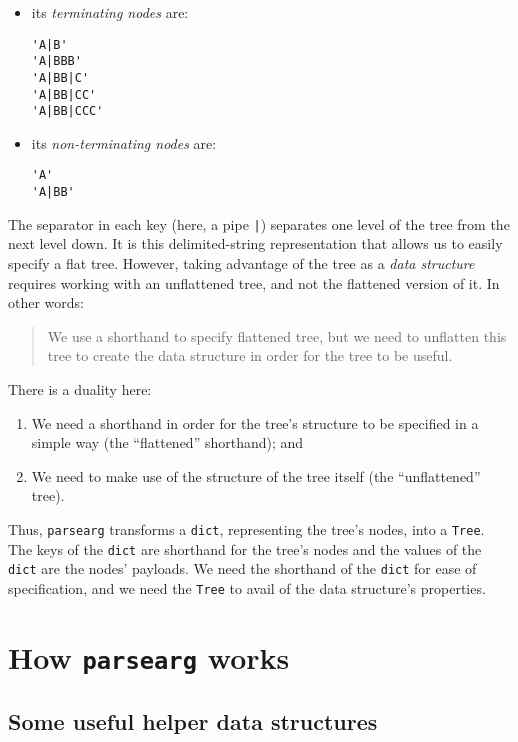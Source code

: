 \documentclass[10pt]{amsart}
\numberwithin{equation}{section}
\begin{document}
\begin{itemize}
\item its \emph{terminating nodes} are:

\begin{verbatim}
'A|B'
'A|BBB'
'A|BB|C'
'A|BB|CC'
'A|BB|CCC'
\end{verbatim}

\item its \emph{non-terminating nodes} are:

\begin{verbatim}
'A'
'A|BB'
\end{verbatim}
\end{itemize}

The separator in each key (here, a pipe \texttt{|}) separates one level of the tree from the
next level down. It is this delimited-string representation that allows us to easily
specify a flat tree. However, taking advantage of the tree as a \emph{data structure}
requires working with an unflattened tree, and not the flattened version of it.
In other words:
\begin{quote}
We use a shorthand to specify flattened tree, but we need to unflatten this tree to
create the data structure in order for the tree to be useful.
\end{quote}

There is a duality here:

\begin{enumerate}
\item We need a shorthand in order for the tree's structure to be specified in a simple way 
(the ``flattened'' shorthand); and

\item We need to make use of the structure of the tree itself 
(the ``unflattened'' tree).
\end{enumerate}

Thus, \texttt{parsearg} transforms a \texttt{dict}, representing the tree's nodes, into a \texttt{Tree}.
The keys of the \texttt{dict} are shorthand for the tree's nodes and the values of the \texttt{dict}
are the nodes' payloads.  We need the shorthand of the \texttt{dict} for ease of specification,
and we need the \texttt{Tree} to avail of the data structure's properties.

\newpage
\section{How \texttt{parsearg} works}
\label{sec:orgc3a8bca}
\subsection{Some useful helper data structures}
\label{sec:org3a20e5d}
\end{document}
